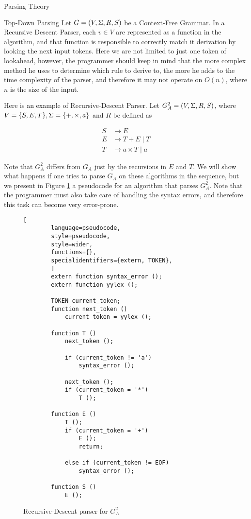 \begin{section}{Parsing Theory}
\begin{subsection}{Top-Down Parsing}
Let $G = (V, \Sigma, R, S)$ be a Context-Free Grammar. In a Recursive Descent
Parser, each $v \in V$ are represented as a function in the algorithm, and
that function is responsible to correctly match it derivation by looking
the next input tokens. Here we are not limited to just one token of lookahead,
however, the programmer should keep in mind that the more complex method
he uses to determine which rule to derive to, the more he adds to the
time complexity of the parser, and therefore it may not operate on $O(n)$,
where $n$ is the size of the input.

Here is an example of Recursive-Descent Parser. Let $G_A^2 = (V, \Sigma, R, S)$,
where $V = \{S, E, T\}, \Sigma = \{+, \times, a\}$ and $R$ be defined as

\begin{align}
S &\rightarrow E \nonumber \\
E &\rightarrow T + E \; | \; T  \nonumber \\
T &\rightarrow a \times T \; | \; a \nonumber
\end{align}

Note that $G_A^2$ differs from $G_A$ just by the recursions in $E$ and $T$. We
will show what happens if one tries to parse $G_A$ on these algorithms in the
sequence, but we present in Figure \ref{fig:recursive-descent} a pseudocode for
an algorithm that parses $G_A^2$. Note that the programmer must also take care
of handling the syntax errors, and therefore this task can become very
error-prone.


\begin{figure}[ht]
	\centering
	\begin{lstlisting}[
		language=pseudocode,
		style=pseudocode,
		style=wider,
		functions={},
		specialidentifiers={extern, TOKEN},
		]
		extern function syntax_error ();
		extern function yylex ();

		TOKEN current_token;
		function next_token ()
			current_token = yylex ();

		function T ()
			next_token ();

			if (current_token != 'a')
				syntax_error ();

			next_token ();
			if (current_token = '*')
				T ();

		function E ()
			T ();
			if (current_token = '+')
				E ();
				return;
			
			else if (current_token != EOF)
				syntax_error ();
		
		function S ()
			E ();
	\end{lstlisting}
\caption{Recursive-Descent parser for $G_A^2$}
\label{fig:recursive-descent}
\end{figure}


\end{subsection}
\end{section}
